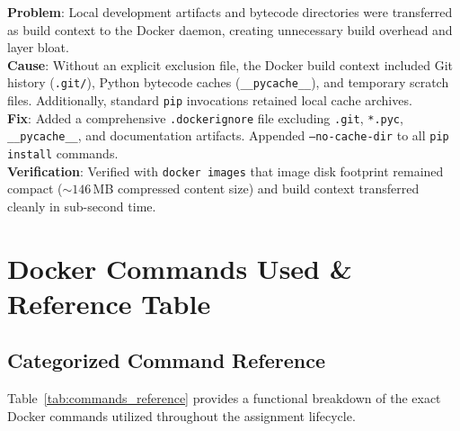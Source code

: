 \documentclass[11pt,a4paper]{article}
\begin{document}
\begin{tcolorbox}[colback=white, colframe=primarycolor!85, boxrule=0.7pt,
                  title={\bfseries Error 4: Excessive Build Context Overhead and Uncached Artifacts}, fonttitle=\small]
\textbf{Problem}: Local development artifacts and bytecode directories were transferred as build context to the Docker daemon, creating unnecessary build overhead and layer bloat.\\
\textbf{Cause}: Without an explicit exclusion file, the Docker build context included Git history (\texttt{.git/}), Python bytecode caches (\texttt{\_\_pycache\_\_}), and temporary scratch files. Additionally, standard \texttt{pip} invocations retained local cache archives.\\
\textbf{Fix}: Added a comprehensive \texttt{.dockerignore} file excluding \texttt{.git}, \texttt{*.pyc}, \texttt{\_\_pycache\_\_}, and documentation artifacts. Appended \texttt{--no-cache-dir} to all \texttt{pip install} commands.\\
\textbf{Verification}: Verified with \texttt{docker images} that image disk footprint remained compact ($\sim 146$\,MB compressed content size) and build context transferred cleanly in sub-second time.
\end{tcolorbox}

\section{Docker Commands Used \& Reference Table}

\subsection{Categorized Command Reference}
Table~\ref{tab:commands_reference} provides a functional breakdown of the exact Docker commands utilized throughout the assignment lifecycle.
\end{document}
